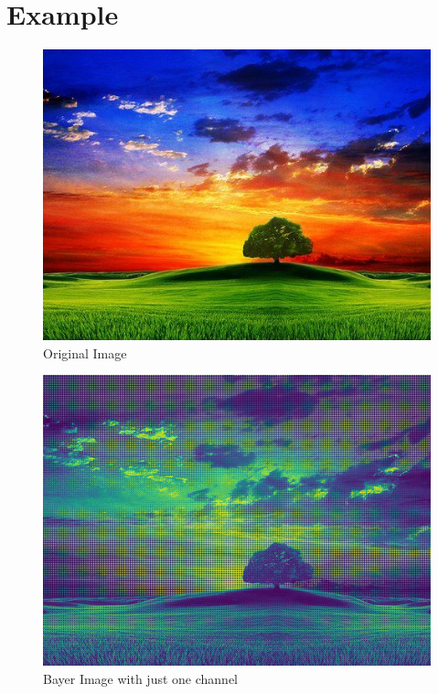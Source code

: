 \documentclass{article}
\begin{document}
\section{Example}
\begin{figure}[H]
    \begin{center}
        \includegraphics[scale=0.5]{originalImage.jpg}
        \caption{Original Image}
    \end{center}
\end{figure}

\begin{figure}[H]
    \begin{center}
        \includegraphics[scale=0.7]{DocResources/BayerImage_SingleChannel.png}
        \caption{Bayer Image with just one channel}
    \end{center}
\end{figure}
\end{document}
